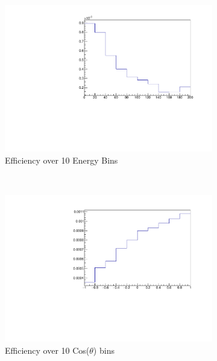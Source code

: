 \documentclass[12pt]{article}
\numberwithin{equation}{section}
\numberwithin{figure}{section}
\begin{document}
\begin{figure}
	\centering
	\begin{subfigure}{0.4\textwidth}
                \includegraphics[scale=0.48,trim={5cm 0 0 0}]{Efficiency_en}
                \caption{Efficiency over 10 Energy Bins}
                \label{fig:eff_en}
    \end{subfigure}~~~~~~~~~~~~~~
    \begin{subfigure}{0.4\textwidth}
                \includegraphics[scale=0.48,trim={2cm 0 0 0}]{Efficiency_cos}
                \caption{Efficiency over 10 Cos($\theta$) bins}
                \label{fig:eff_cos}
    \end{subfigure}\\
    \begin{subfigure}{0.4\textwidth}

\end{subfigure}
\end{figure}
\end{document}
